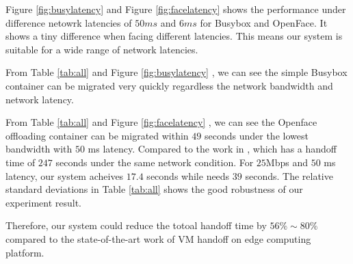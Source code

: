 
Figure \ref{fig:busylatency}
and
Figure \ref{fig:facelatency} shows the performance under difference netowrk latencies of $50ms$ and $6ms$ for Busybox and OpenFace.  It shows a tiny difference when facing different latencies. This means our system is suitable for a wide range of network latencies.


From Table \ref{tab:all} and Figure \ref{fig:busylatency} , we can see the simple Busybox container can be migrated very quickly regardless the network bandwidth and network latency. 

From Table \ref{tab:all} and Figure \ref{fig:facelatency} , we can see the Openface offloading container can be migrated within $49$ seconds under the lowest bandwidth with $50$ ms latency. Compared to the work in \cite{ha2015vmhandoff}, which has a handoff time of $247$ seconds under the same network condition. For $25$Mbps and $50$ ms latency, our system acheives $17.4$ seconds while  \cite{ha2015vmhandoff}  needs $39$ seconds. The relative standard deviations in Table \ref{tab:all} shows the good robustness of our experiment result.


Therefore, our system could reduce the totoal handoff time by $56\%\sim 80\%$ compared to the state-of-the-art work of VM handoff \cite{ha2015vmhandoff} on edge computing platform. 















